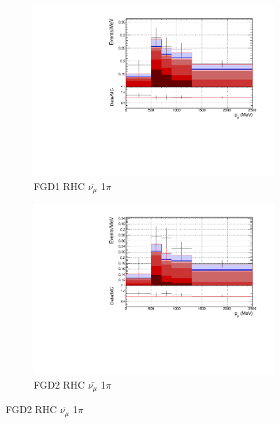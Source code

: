 \begin{figure}[!h]
\begin{subfigure}{0.49\textwidth}
  \centering
  \includegraphics[width=\textwidth]{figs/FGD1_anti-numuCC_1pi_p}
  \caption{FGD1 RHC $\bar{\nu_{\mu}}$ 1$\pi$}
\end{subfigure}
\centering
\begin{subfigure}{0.49\textwidth}
  \centering
  \includegraphics[width=\textwidth]{figs/FGD2_anti-numuCC_1pi_p}
  \caption{FGD2 RHC $\bar{\nu_{\mu}}$ 1$\pi$}
\end{subfigure}


\end{figure}
